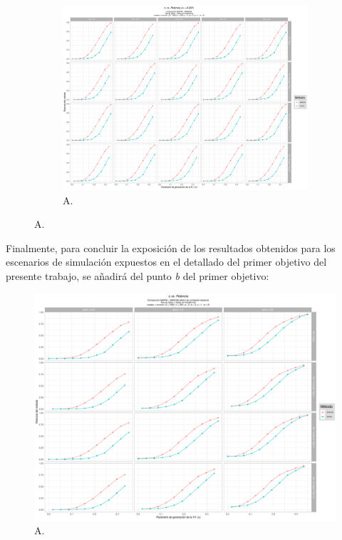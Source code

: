 \documentclass[IB,BIB]{TFUOC}%
\begin{document}
\begin{figure}[!htbp]
\begin{subfigure}{.65\textwidth}
\hspace*{3.5cm} %
  \centering
  \includegraphics[width=.9\linewidth]{OBJ1c30001.pdf}
  \caption{\scriptsize{A.}}
  \label{fig:OBJ1c30001}
\end{subfigure}
\caption{\scriptsize{A.}}
\label{fig:OBJ1c}
\end{figure}

Finalmente, para concluir la exposición de los resultados obtenidos para los escenarios de simulación expuestos en el detallado del primer objetivo del presente trabajo, se añadirá del punto \textit{b} del primer objetivo:

\begin{figure}[!htbp]
\hspace*{-1.6cm} %
    \centering
    \includegraphics[scale=.51]{OBJ1dallalpha.pdf}
    \caption{\scriptsize{A.}}
    \label{fig:OBJ1dallalpha}
\end{figure}
\end{document}
